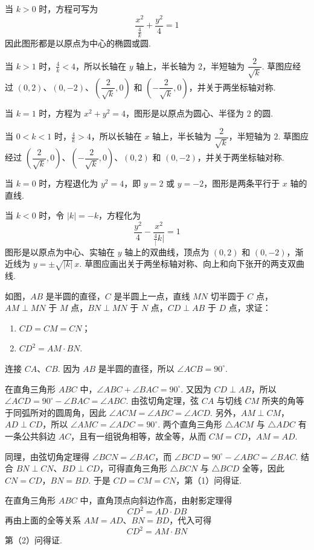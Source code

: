 \begin{solution}
当 \(k>0\) 时，方程可写为
\[
\frac{x^{2}}{\frac{4}{k}}+\frac{y^{2}}{4}=1
\]
因此图形都是以原点为中心的椭圆或圆.

当 \(k>1\) 时，\(\frac{4}{k}<4\)，所以长轴在 \(y\) 轴上，半长轴为 \(2\)，半短轴为 \(\dfrac{2}{\sqrt{k}}\). 草图应经过 \((0,2)\)、\((0,-2)\)、\(\left(\dfrac{2}{\sqrt{k}},0\right)\) 和 \(\left(-\dfrac{2}{\sqrt{k}},0\right)\)，并关于两坐标轴对称.

当 \(k=1\) 时，方程为 \(x^{2}+y^{2}=4\)，图形是以原点为圆心、半径为 \(2\) 的圆.

当 \(0<k<1\) 时，\(\frac{4}{k}>4\)，所以长轴在 \(x\) 轴上，半长轴为 \(\dfrac{2}{\sqrt{k}}\)，半短轴为 \(2\). 草图应经过 \(\left(\dfrac{2}{\sqrt{k}},0\right)\)、\(\left(-\dfrac{2}{\sqrt{k}},0\right)\)、\((0,2)\) 和 \((0,-2)\)，并关于两坐标轴对称.

当 \(k=0\) 时，方程退化为 \(y^{2}=4\)，即 \(y=2\) 或 \(y=-2\)，图形是两条平行于 \(x\) 轴的直线.

当 \(k<0\) 时，令 \(\lvert k\rvert=-k\)，方程化为
\[
\frac{y^{2}}{4}-\frac{x^{2}}{\frac{4}{\lvert} k\rvert}=1
\]
图形是以原点为中心、实轴在 \(y\) 轴上的双曲线，顶点为 \((0,2)\) 和 \((0,-2)\)，渐近线为 \(y=\pm\sqrt{\lvert k\rvert}\,x\). 草图应画出关于两坐标轴对称、向上和向下张开的两支双曲线.
\end{solution}

\begin{problem}
如图，\(AB\) 是半圆的直径，\(C\) 是半圆上一点，直线 \(MN\) 切半圆于 \(C\) 点，\(AM\perp MN\) 于 \(M\) 点，\(BN\perp MN\) 于 \(N\) 点，\(CD\perp AB\) 于 \(D\) 点，求证：

\begin{enumerate}
\item \(CD=CM=CN\)；
\item \(CD^{2}=AM\cdot BN\).
\end{enumerate}

\end{problem}

\begin{solution}
连接 \(CA\)、\(CB\). 因为 \(AB\) 是半圆的直径，所以 \(\angle ACB=90^{\circ}\).

在直角三角形 \(ABC\) 中，\(\angle ABC+\angle BAC=90^{\circ}\). 又因为 \(CD\perp AB\)，所以 \(\angle ACD=90^{\circ}-\angle BAC=\angle ABC\). 由弦切角定理，弦 \(CA\) 与切线 \(CM\) 所夹的角等于同弧所对的圆周角，因此 \(\angle ACM=\angle ABC=\angle ACD\). 另外，\(AM\perp CM\)，\(AD\perp CD\)，所以 \(\angle AMC=\angle ADC=90^{\circ}\). 两个直角三角形 \(\triangle ACM\) 与 \(\triangle ADC\) 有一条公共斜边 \(AC\)，且有一组锐角相等，故全等，从而
\(CM=CD\)，\(AM=AD\).

同理，由弦切角定理得 \(\angle BCN=\angle BAC\)，而 \(\angle BCD=90^{\circ}-\angle ABC=\angle BAC\). 结合 \(BN\perp CN\)、\(BD\perp CD\)，可得直角三角形 \(\triangle BCN\) 与 \(\triangle BCD\) 全等，因此
\(CN=CD\)，\(BN=BD\).
于是 \(CD=CM=CN\)，第（1）问得证.

在直角三角形 \(ABC\) 中，直角顶点向斜边作高，由射影定理得
\[
CD^{2}=AD\cdot DB
\]
再由上面的全等关系 \(AM=AD\)、\(BN=BD\)，代入可得
\[
CD^{2}=AM\cdot BN
\]
第（2）问得证.
\end{solution}

